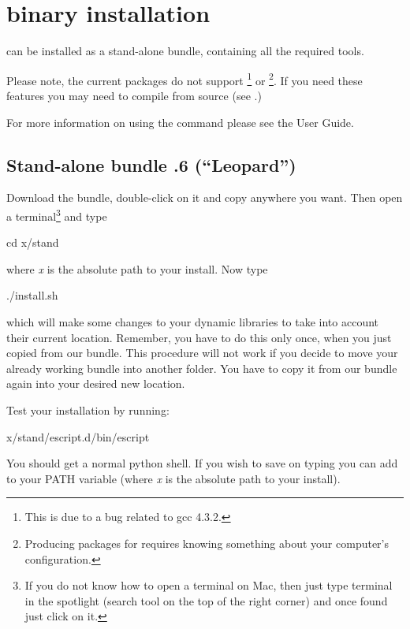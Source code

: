 %
%
%

\section{\macosx binary installation}
\label{sec:binmac}

\esfinley can be installed as a stand-alone bundle, containing all the required tools.

Please note, the current packages do not support \openmp\footnote{This is due to a bug related to gcc 4.3.2.} or \mpi\footnote{Producing packages for \mpi requires knowing something about your computer's configuration.}.
If you need these features you may need to compile \esfinley from source (see .)

For more information on using the  command please see the User Guide.

\subsection{Stand-alone bundle .6 (``Leopard'')}

Download the bundle, double-click on it and copy   anywhere you want.
Then open a terminal\footnote{If you do not know how to open a terminal on Mac, then just type terminal in the spotlight (search tool on the top of the right corner) and once found just click on it.} and type
\begin{shellCode}
cd x/stand 
\end{shellCode}
where \textit{x} is the absolute path to your install. 
Now type
\begin{shellCode}
./install.sh 
\end{shellCode}
which will make some changes to your dynamic libraries to take into account their current location. Remember, you have  to do this only once, when you just copied from our bundle. This procedure will not work if you decide to move your already working bundle into another folder. You have to copy it from our bundle again into your desired new location.

Test your installation by running:
\begin{shellCode}
 x/stand/escript.d/bin/escript
\end{shellCode}
You should get a normal python shell.
If you wish to save on typing you can add  to your PATH variable (where \textit{x} is the absolute path to your install). 


